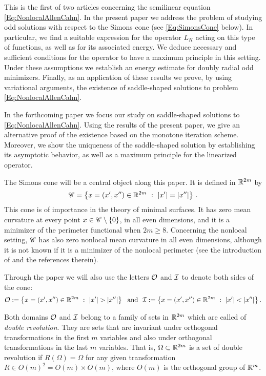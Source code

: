 This is the first of two articles concerning the semilinear equation \eqref{Eq:NonlocalAllenCahn}. In the present paper we address the problem of studying odd solutions with respect to the Simons cone (see \eqref{Eq:SimonsCone} below). In particular, we find a suitable expression for the operator $L_K$  acting on this type of functions, as well as for its associated energy. We deduce necessary and sufficient conditions for the operator to have a maximum principle in this setting. Under these assumptions we establish an energy estimate for doubly radial odd minimizers. Finally, as an application of these results we prove, by using variational arguments, the existence of saddle-shaped solutions to problem \eqref{Eq:NonlocalAllenCahn}.

In the forthcoming paper \cite{FelipeSanz-Perela:IntegroDifferentialII} we focus our study on saddle-shaped solutions to \eqref{Eq:NonlocalAllenCahn}. Using the results of the present paper, we give an alternative proof of the existence based on the monotone iteration scheme. Moreover, we show the uniqueness of the saddle-shaped solution by establishing its asymptotic behavior, as well as a maximum principle for the linearized operator.

The Simons cone will be a central object along this paper. It is defined in $\mathbb{R}^{2m}$ by
\begin{equation}
\label{Eq:SimonsCone}
\mathscr{C} = \left \{ x = (x', x'') \in \mathbb{R}^{2m} \ : \ |x'| = |x''| \right \}\,.
\end{equation}
This cone is of importance in the theory of minimal surfaces. It has zero mean curvature at every point $x\in \mathscr{C} \setminus \{0\}$, in all even dimensions, and it is a minimizer of the perimeter functional when $2m\geq 8$. Concerning the nonlocal setting, $\mathscr{C}$ has also zero nonlocal mean curvature in all even dimensions, although it is not known if it is a minimizer of the nonlocal perimeter (see the introduction of \cite{Felipe-Sanz-Perela:SaddleFractional} and the references therein).

Through the paper we will also use the letters $\mathcal{O}$ and $\mathcal{I}$ to denote both sides of the cone:
\begin{equation}
\label{Eq:DefOandI}
\mathcal{O}:= \left \{ x = (x', x'') \in \mathbb{R}^{2m} \ : \ |x'| > |x''| \right \} \ \textrm{ and } \
\mathcal{I}:= \left \{ x = (x', x'') \in \mathbb{R}^{2m} \ : \ |x'| < |x''| \right \}.
\end{equation}



Both domains $\mathcal{O}$ and $\mathcal{I}$ belong to a family of sets in $\mathbb{R}^{2m}$ which are called of \emph{double revolution}. They are sets that are invariant under orthogonal transformations in the first $m$ variables and also under orthogonal transformations in the last $m$ variables. That is, $\Omega\subset \mathbb{R}^{2m}$ is a set of double revolution if $R(\Omega) = \Omega$ for any given transformation $R\in O(m)^2 = O(m) \times O(m)$, where  $O(m)$ is the orthogonal group of $\mathbb{R}^m$.

